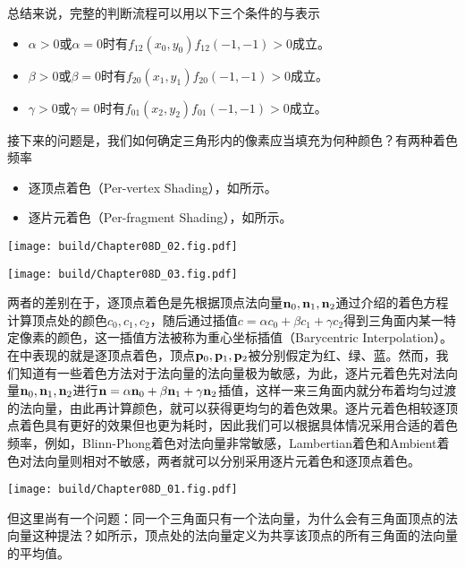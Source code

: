 总结来说，完整的判断流程可以用以下三个条件的与表示
\begin{itemize}
    \item $\alpha>0$或$\alpha=0$时有$f_{12}(x_0,y_0)f_{12}(-1,-1)>0$成立。
    \item $\beta>0$或$\beta=0$时有$f_{20}(x_1,y_1)f_{20}(-1,-1)>0$成立。
    \item $\gamma>0$或$\gamma=0$时有$f_{01}(x_2,y_2)f_{01}(-1,-1)>0$成立。
\end{itemize}
接下来的问题是，我们如何确定三角形内的像素应当填充为何种颜色？有两种着色频率
\begin{itemize}
    \item 逐顶点着色（Per-vertex Shading），如所示。
    \item 逐片元着色（Per-fragment Shading），如所示。
\end{itemize}
\begin{Figure}[着色频率]
    \begin{FigureSub}[逐顶点着色]
        \texttt{[image: build/Chapter08D\_02.fig.pdf]}
    \end{FigureSub}
    \hspace{0.5cm}
    \begin{FigureSub}[逐片元着色]
        \texttt{[image: build/Chapter08D\_03.fig.pdf]}
    \end{FigureSub}
\end{Figure}
两者的差别在于，逐顶点着色是先根据顶点法向量$\vb{n}_0,\vb{n}_1,\vb{n}_2$通过介绍的着色方程计算顶点处的颜色$c_0,c_1,c_2$，随后通过插值$c=\alpha c_0+\beta c_1+\gamma c_2$得到三角面内某一特定像素的颜色，这一插值方法被称为重心坐标插值（Barycentric Interpolation）。在中表现的就是逐顶点着色，顶点$\vb{p}_0,\vb{p}_1,\vb{p}_2$被分别假定为红、绿、蓝。然而，我们知道有一些着色方法对于法向量的法向量极为敏感，为此，逐片元着色先对法向量$\vb{n}_0,\vb{n}_1,\vb{n}_2$进行$\vb{n}=\alpha\vb{n}_0+\beta\vb{n}_1+\gamma\vb{n}_2$插值，这样一来三角面内就分布着均匀过渡的法向量，由此再计算颜色，就可以获得更均匀的着色效果。逐片元着色相较逐顶点着色具有更好的效果但也更为耗时，因此我们可以根据具体情况采用合适的着色频率，例如，Blinn-Phong着色对法向量非常敏感，Lambertian着色和Ambient着色对法向量则相对不敏感，两者就可以分别采用逐片元着色和逐顶点着色。

\begin{Figure}[顶点处的法向量]
    \texttt{[image: build/Chapter08D\_01.fig.pdf]}
\end{Figure}

但这里尚有一个问题：同一个三角面只有一个法向量，为什么会有三角面顶点的法向量这种提法？如所示，顶点处的法向量定义为共享该顶点的所有三角面的法向量的平均值。
